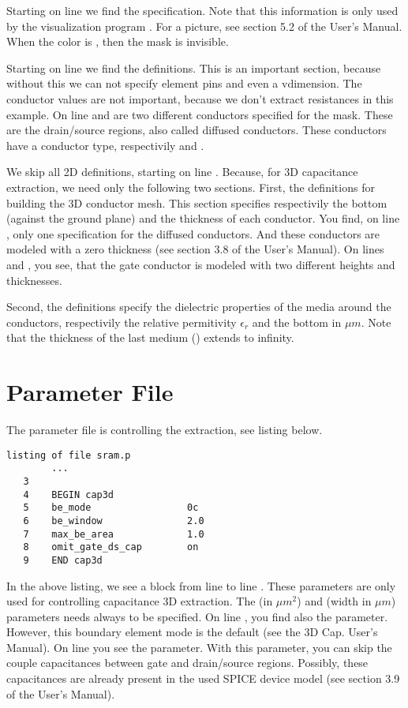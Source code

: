 Starting on line  we find the  specification.
Note that this information is only used by the visualization program .
For a picture, see section 5.2 of the User's Manual.
When the color is , then the mask is invisible.

Starting on line  we find the  definitions.
This is an important section, because without this we can not specify
element pins and even a vdimension.
The conductor values are not important,
because we don't extract resistances in this example.
On line  and  are two different conductors specified for the  mask.
These are the drain/source regions, also called diffused conductors.
These conductors have a conductor type, respectivily  and .

We skip all 2D  definitions, starting on line .
Because, for 3D capacitance extraction, we need only the following two sections.
First, the  definitions for building the 3D conductor mesh.
This section specifies respectivily the bottom (against the ground plane) and the thickness
of each conductor.
You find, on line , only one specification for the diffused conductors.
And these conductors are modeled with a zero thickness (see section 3.8 of the User's Manual).
On lines  and , you see, that the gate conductor  is modeled with
two different heights and thicknesses.

Second, the  definitions specify the dielectric properties of the media
around the conductors, respectivily the relative permitivity $\epsilon_r$ and the bottom in $\mu m$.
Note that the thickness of the last medium () extends to infinity.

\section{Parameter File}
\label{SRparam}
The parameter file  is controlling the extraction, see listing below.

\small \begin{Verbatim}[frame=single]
listing of file sram.p
        ...
   3
   4    BEGIN cap3d
   5    be_mode                 0c
   6    be_window               2.0
   7    max_be_area             1.0
   8    omit_gate_ds_cap        on
   9    END cap3d
\end{Verbatim}
\normalsize
In the above listing, we see a  block from line  to line .
These parameters are only used for controlling capacitance 3D extraction.
The  (in $\mu m^2$) and  (width in $\mu m$) parameters
needs always to be specified.
On line , you find also the  parameter.
However, this boundary element mode is the default (see the 3D Cap. User's Manual).
On line  you see the  parameter.
With this parameter, you can skip the couple capacitances between gate and drain/source regions.
Possibly, these capacitances are already present in the used SPICE device model
(see section 3.9 of the User's Manual).

